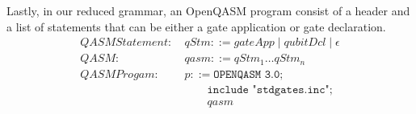 Lastly, in our reduced grammar, an OpenQASM program consist of a header and a list of statements that can be either a gate application or gate declaration.
\begin{align*}
    QASMStatement: \ & qStm::= gateApp \mid qubitDcl \mid \epsilon\\
    QASM: \ & qasm ::= qStm_1 \dots qStm_n\\
    QASMProgam: \ & p ::= \texttt{OPENQASM 3.0;}\\
            & \quad \quad \texttt{include "stdgates.inc";}\\
            & \quad \quad qasm
\end{align*}